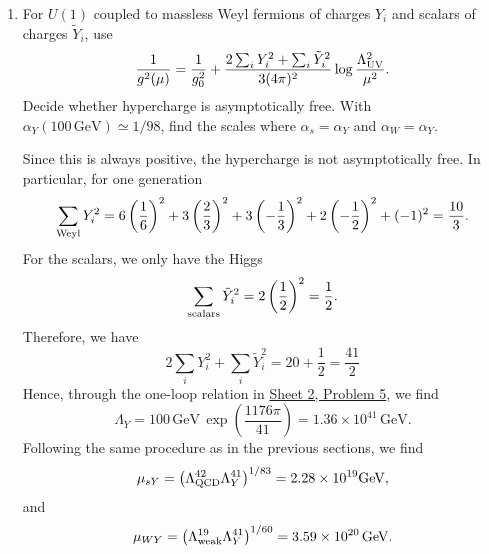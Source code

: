\begin{enumerate}[label=\alph*)]
    \item For $U(1)$ coupled to massless Weyl fermions of charges
    $Y_i$ and scalars of charges $\tilde Y_i$, use
    \begin{equation}
        \frac1{g^2(\mu)}=\frac1{g_0^2}
        +\frac{2\sum_iY_i^2+\sum_i\tilde Y_i^2}
        {3(4\pi)^2}
        \log\frac{\Lambda_{\rm UV}^2}{\mu^2}.
    \end{equation}
    Decide whether hypercharge is asymptotically free. With
    $\alpha_Y(100\,\mathrm{GeV})\simeq1/98$, find the scales
    where $\alpha_s=\alpha_Y$ and $\alpha_W=\alpha_Y$.
    \begin{solution}
        Since this is always positive, the hypercharge is not asymptotically free. In particular, for one generation
        \begin{equation}
\sum_{\rm Weyl}Y_i^2
=
6\left(\frac16\right)^2
+3\left(\frac23\right)^2
+3\left(-\frac13\right)^2
+2\left(-\frac12\right)^2
+(-1)^2
=
\frac{10}{3}.
        \end{equation}
         For the scalars, we only have the Higgs
         \begin{equation}
             \sum_{\rm scalars}\tilde Y_i^2=2\left(\frac12\right)^2=\frac12.
         \end{equation}
        Therefore, we have
        \begin{equation}
            2\sum_iY_i^2+\sum_i\tilde Y_i^2=20+\frac12=\frac{41}{2}
        \end{equation}
        Hence, through the one-loop relation in \href{https://luca-yucheng-jin.github.io/luca-physics-site/notes/tong-sm-sheet-2.html#sheet-2-problem-5-one-loop-qcd-scale}{Sheet 2, Problem 5}, we find
        \begin{equation}
            \Lambda_Y=100\,\mathrm{GeV}\,\exp\left(\frac{1176\pi}{41}\right) = 1.36\times10^{41}\,\mathrm{GeV}.
        \end{equation}
        Following the same procedure as in the previous sections, we find
        \begin{equation}
\mu_{sY}
=
\left(
\Lambda_{\rm QCD}^{42}
\Lambda_Y^{41}
\right)^{1/83} = 2.28 \times 10^{19} {\rm GeV},
        \end{equation}
        and
        \begin{equation}
\mu_{WY}
=
\left(
\Lambda_{\rm weak}^{19}
\Lambda_Y^{41}
\right)^{1/60}=3.59\times10^{20}\,\mathrm{GeV}.
        \end{equation}
    \end{solution}

\end{enumerate}

